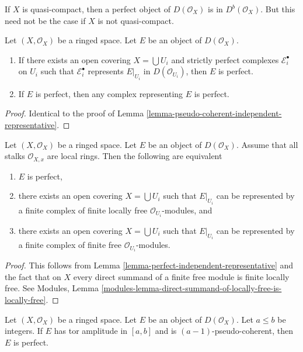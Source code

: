 \noindent
If $X$ is quasi-compact, then a perfect object of $D(\mathcal{O}_X)$
is in $D^b(\mathcal{O}_X)$. But this need not be the case if
$X$ is not quasi-compact.

\begin{lemma}
\label{lemma-perfect-independent-representative}
Let $(X, \mathcal{O}_X)$ be a ringed space.
Let $E$ be an object of $D(\mathcal{O}_X)$.
\begin{enumerate}
\item If there exists an open covering $X = \bigcup U_i$ and
strictly perfect complexes $\mathcal{E}_i^\bullet$ on $U_i$
such that $\mathcal{E}_i^\bullet$ represents $E|_{U_i}$ in
$D(\mathcal{O}_{U_i})$, then $E$ is perfect.
\item If $E$ is perfect, then any complex representing $E$ is perfect.
\end{enumerate}
\end{lemma}

\begin{proof}
Identical to the proof of
Lemma \ref{lemma-pseudo-coherent-independent-representative}.
\end{proof}

\begin{lemma}
\label{lemma-perfect-on-locally-ringed}
Let $(X, \mathcal{O}_X)$ be a ringed space. Let $E$ be an object of
$D(\mathcal{O}_X)$. Assume that all stalks $\mathcal{O}_{X, x}$
are local rings. Then the following are equivalent
\begin{enumerate}
\item $E$ is perfect,
\item there exists an open covering $X = \bigcup U_i$ such that
$E|_{U_i}$ can be represented by a finite complex of finite locally
free $\mathcal{O}_{U_i}$-modules, and
\item there exists an open covering $X = \bigcup U_i$ such that
$E|_{U_i}$ can be represented by a finite complex of finite
free $\mathcal{O}_{U_i}$-modules.
\end{enumerate}
\end{lemma}

\begin{proof}
This follows from Lemma \ref{lemma-perfect-independent-representative}
and the fact that on $X$ every direct summand of a finite free module
is finite locally free. See Modules, Lemma
\ref{modules-lemma-direct-summand-of-locally-free-is-locally-free}.
\end{proof}

\begin{lemma}
\label{lemma-perfect-precise}
Let $(X, \mathcal{O}_X)$ be a ringed space.
Let $E$ be an object of $D(\mathcal{O}_X)$.
Let $a \leq b$ be integers. If $E$ has tor amplitude in $[a, b]$
and is $(a - 1)$-pseudo-coherent, then $E$ is perfect.
\end{lemma}

